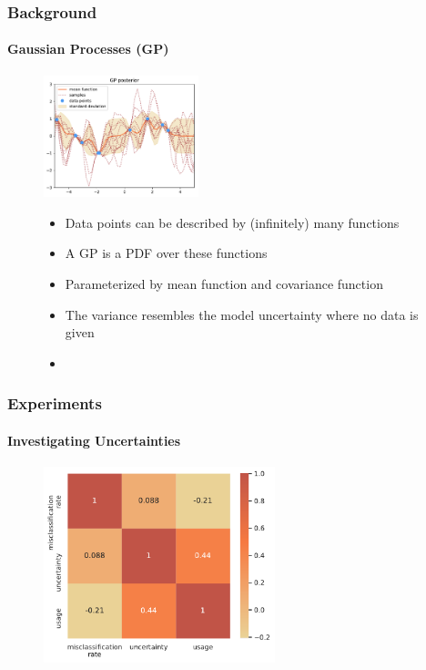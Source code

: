 \documentclass[9pt]{beamer}
\begin{document}
\begin{frame}
\frametitle{Background}
\framesubtitle{Gaussian Processes (GP)}
\begin{figure}
	\centering
	\includegraphics[width=0.4\textwidth]{images/post.pdf}
	\begin{itemize}
		\item Data points can be described by (infinitely) many functions
		\item A GP is a PDF over these functions
		\item Parameterized by mean function and covariance function
		\item The variance resembles the model uncertainty where no data is given
		\item 
	\end{itemize}
\end{figure}
\end{frame}




\begin{frame}
\frametitle{Experiments}
\framesubtitle{Investigating Uncertainties}
	\begin{figure}
		\centering
		\includegraphics[width=0.6\textwidth]{images/corr_matrix.pdf}
	\end{figure}
\end{frame}
\end{document}
